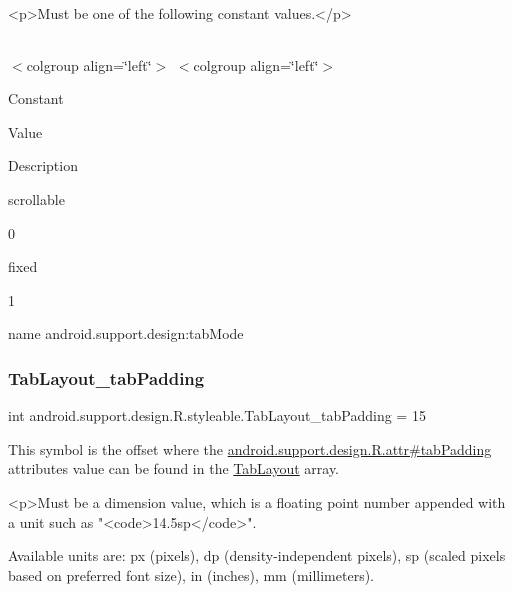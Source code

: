 \begin{DoxyVerb}      <p>Must be one of the following constant values.</p>
\end{DoxyVerb}
 \tabulinesep=1mm
\begin{longtabu} spread 0pt [c]{*{0}{|X[-1]}|}
\hline
\end{longtabu}
$<$colgroup align=\char`\"{}left\char`\"{}$>$ $<$colgroup align=\char`\"{}left\char`\"{}$>$ 

Constant

Value

Description 

{\ttfamily scrollable}

0

{\ttfamily fixed}

1

name android.\+support.\+design\+:tab\+Mode \mbox{\label{classandroid_1_1support_1_1design_1_1R_1_1styleable_add60aab90e40a18e99ddd5db07708466}} 
\subsubsection{\texorpdfstring{Tab\+Layout\+\_\+tab\+Padding}{TabLayout\_tabPadding}}
{\footnotesize\ttfamily int android.\+support.\+design.\+R.\+styleable.\+Tab\+Layout\+\_\+tab\+Padding = 15\hspace{0.3cm}{\ttfamily [static]}}

This symbol is the offset where the \hyperlink{classandroid_1_1support_1_1design_1_1R_1_1attr_a1d4456538a96cc563b1041fe9af458b5}{android.\+support.\+design.\+R.\+attr\#tab\+Padding} attribute\textquotesingle{}s value can be found in the \hyperlink{classandroid_1_1support_1_1design_1_1R_1_1styleable_a514b47b47f600f9421b65f4f0aa832d6}{Tab\+Layout} array.

\begin{DoxyVerb}      <p>Must be a dimension value, which is a floating point number appended with a unit such as "<code>14.5sp</code>".
\end{DoxyVerb}
 Available units are\+: px (pixels), dp (density-\/independent pixels), sp (scaled pixels based on preferred font size), in (inches), mm (millimeters). 

